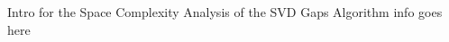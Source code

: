 \documentclass[../../ClusteringConnectionsMAIN.tex]{subfiles}
\begin{document}
\begin{flushleft}
\begin{large}

Intro for the Space Complexity Analysis of the SVD Gaps Algorithm info goes here


\end{large}
\end{flushleft}
\end{document}
